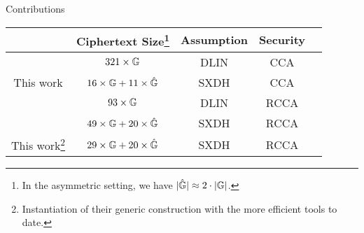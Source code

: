 % 


\begin{frame}{Contributions}
  \begin{center}
    \begin{tabular}{|c|c|c|c|c|}
      \hline
      & Ciphertext Size\footnote{In the asymmetric setting, we have $|\hat{\mathbb{G}}| \approx 2 \cdot |\mathbb{G}|$.} & Assumption & Security\\
      \hline
      \cite{DBLP:conf/pkc/AbeDKNO13} & $321\times\mathbb{G}$ & DLIN & CCA\\
      \hline
      {\color{red}This work} & {\color{red}$16\times\mathbb{G} + 11\times\hat{\mathbb{G}}$} & SXDH & CCA\\
      \hline
      \cite{DBLP:conf/eurocrypt/ChaseKLM12} & $93 \times \mathbb{G}$ & DLIN & RCCA\\
      \hline
      \cite{DBLP:conf/eurocrypt/ChaseKLM12} & $49\times\mathbb{G} +20 \times\hat{\mathbb{G}}$ & SXDH & RCCA\\
      \hline
      {\color{red}This work\footnote{Instantiation of their generic construction with the more efficient tools to date.}} & {\color{red}$29 \times\mathbb{G} + 20 \times\hat{\mathbb{G}}$} & SXDH & RCCA\\
      \hline
    \end{tabular}
  \end{center}

\end{frame}
